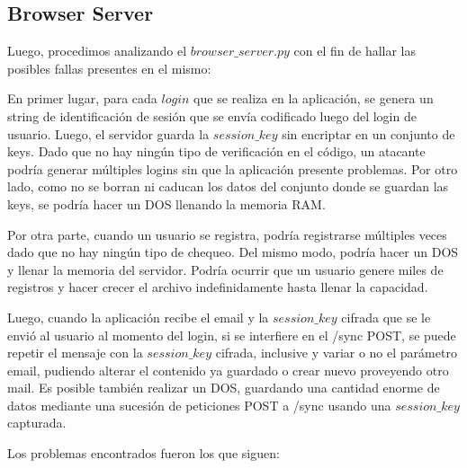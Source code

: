 \documentclass[10pt, a4paper]{article}
\begin{document}
\newpage
\subsection{Browser Server}
Luego, procedimos analizando el $browser\_server.py$ con el fin de hallar las posibles fallas presentes en el mismo:

\begin{shaded}
En primer lugar, para cada $login$ que se realiza en la aplicación, se genera un string de identificación de sesión que se envía codificado luego del login de usuario. Luego, el servidor guarda la $session\_key$ sin encriptar en un conjunto de keys. Dado que no hay ningún tipo de verificación en el código, un atacante podría generar múltiples logins sin que la aplicación presente problemas. Por otro lado, como no se borran ni caducan los datos del conjunto donde se guardan las keys, se podría hacer un DOS llenando la memoria RAM.

Por otra parte, cuando un usuario se registra, podría registrarse múltiples veces dado que no hay ningún tipo de chequeo. Del mismo modo, podría hacer un DOS y llenar la memoria del servidor. Podría ocurrir que un usuario genere miles de registros y hacer crecer el archivo indefinidamente hasta llenar la capacidad.

Luego, cuando la aplicación recibe el email y la $session\_key$ cifrada que se le envió al usuario al momento del login, si se interfiere en el /sync POST, se puede repetir el mensaje con la $session\_key$ cifrada, inclusive y variar o no el parámetro email, pudiendo alterar el contenido ya guardado o crear nuevo proveyendo otro mail. Es posible también realizar un DOS, guardando una cantidad enorme de datos mediante una sucesión de peticiones POST a /sync usando una $session\_key$ capturada.
\end{shaded}


Los problemas encontrados fueron los que siguen:
\end{document}
